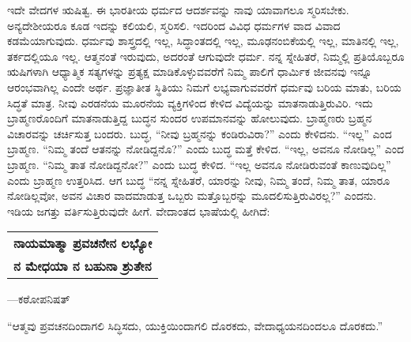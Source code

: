 ಇದೇ ವೇದಗಳ ಋಷಿತ್ವ. ಈ ಭಾರತೀಯ ಧರ್ಮದ ಆದರ್ಶವನ್ನು ನಾವು ಯಾವಾಗಲೂ ಸ್ಮರಿಸಬೇಕು. ಅನ್ಯದೇಶೀಯರೂ ಕೂಡ ಇದನ್ನು ಕಲಿಯಲಿ, ಸ್ಮರಿಸಲಿ. ಇದರಿಂದ ವಿವಿಧ ಧರ್ಮಗಳ ವಾದ ವಿವಾದ ಕಡಮೆಯಾಗುವುದು. ಧರ್ಮವು ಶಾಸ್ತ್ರದಲ್ಲಿ ಇಲ್ಲ, ಸಿದ್ಧಾಂತದಲ್ಲಿ ಇಲ್ಲ, ಮೂಢನಂಬಿಕೆಯಲ್ಲಿ ಇಲ್ಲ, ಮಾತಿನಲ್ಲಿ ಇಲ್ಲ, ತರ್ಕದಲ್ಲಿಯೂ ಇಲ್ಲ. ಆತ್ಮನಂತೆ ಇರುವುದು, ಅದರಂತೆ ಆಗುವುದೇ ಧರ್ಮ. ನನ್ನ ಸ್ನೇಹಿತರೆ, ನಿಮ್ಮಲ್ಲಿ ಪ್ರತಿಯೊಬ್ಬರೂ ಋಷಿಗಳಾಗಿ ಆಧ್ಯಾತ್ಮಿಕ ಸತ್ಯಗಳನ್ನು ಪ್ರತ್ಯಕ್ಷ ಮಾಡಿಕೊಳ್ಳುವವರೆಗೆ ನಿಮ್ಮ ಪಾಲಿಗೆ ಧಾರ್ಮಿಕ ಜೀವನವು ಇನ್ನೂ ಆರಂಭವಾಗಿಲ್ಲ ಎಂದೇ ಅರ್ಥ. ಪ್ರಜ್ಞಾತೀತ ಸ್ಥಿತಿಯು ನಿಮಗೆ ಲಭ್ಯವಾಗುವವರೆಗೆ ಧರ್ಮವು ಬರಿಯ ಮಾತು, ಬರಿಯ ಸಿದ್ಧತೆ ಮಾತ್ರ. ನೀವು ಎರಡನೆಯ ಮೂರನೆಯ ವ್ಯಕ್ತಿಗಳಿಂದ ಕೇಳಿದ ವಿದ್ಯೆಯನ್ನು ಮಾತನಾಡುತ್ತಿರುವಿರಿ. ಇದು ಬ್ರಾಹ್ಮಣರೊಂದಿಗೆ ಮಾತನಾಡುತ್ತಿದ್ದ ಬುದ್ಧನ ಸುಂದರ ಉಪಮಾನವನ್ನು ಹೋಲುವುದು. ಬ್ರಾಹ್ಮಣರು ಬ್ರಹ್ಮನ ವಿಚಾರವನ್ನು ಚರ್ಚಿಸುತ್ತ ಬಂದರು. ಬುದ್ಧ, “ನೀವು ಬ್ರಹ್ಮನನ್ನು ಕಂಡಿರುವಿರಾ?” ಎಂದು ಕೇಳಿದನು. “ಇಲ್ಲ” ಎಂದ ಬ್ರಾಹ್ಮಣ. “ನಿಮ್ಮ ತಂದೆ ಆತನನ್ನು ನೋಡಿದ್ದನೊ?” ಎಂದು ಬುದ್ಧ ಮತ್ತೆ ಕೇಳಿದ. “ಇಲ್ಲ, ಅವನೂ ನೋಡಿಲ್ಲ” ಎಂದ ಬ್ರಾಹ್ಮಣ. “ನಿಮ್ಮ ತಾತ ನೋಡಿದ್ದನೋ?” ಎಂದು ಬುದ್ಧ ಕೇಳಿದ. “ಇಲ್ಲ ಅವನೂ ನೋಡಿರುವಂತೆ ಕಾಣುವುದಿಲ್ಲ” ಎಂದು ಬ್ರಾಹ್ಮಣ ಉತ್ತರಿಸಿದ. ಆಗ ಬುದ್ಧ “ನನ್ನ ಸ್ನೇಹಿತರೆ, ಯಾರನ್ನು ನೀವು, ನಿಮ್ಮ ತಂದೆ, ನಿಮ್ಮ ತಾತ, ಯಾರೂ ನೋಡಿಲ್ಲವೋ, ಅವನ ವಿಚಾರ ವಾದಮಾಡುತ್ತ ಒಬ್ಬರು ಮತ್ತೊಬ್ಬರನ್ನು ಮೂದಲಿಸುತ್ತಿರುವಿರಲ್ಲ?” ಎಂದನು. ಇಡಿಯ ಜಗತ್ತು ವರ್ತಿಸುತ್ತಿರುವುದೇ ಹೀಗೆ. ವೇದಾಂತದ ಭಾಷೆಯಲ್ಲಿ ಹೀಗಿದೆ:

\vskip 3pt

\begin{longtable}{@{}l@{}}
\textbf{ನಾಯಮಾತ್ಮಾ ಪ್ರವಚನೇನ ಲಭ್ಯೋ} \\
\textbf{ನ ಮೇಧಯಾ ನ ಬಹುನಾ ಶ್ರುತೇನ} \\
\end{longtable}

\vskip 2pt

\hfill —ಕಠೋಪನಿಷತ್​

\vskip 6pt

“ಆತ್ಮವು ಪ್ರವಚನದಿಂದಾಗಲಿ ಸಿದ್ಧಿಸದು, ಯುಕ್ತಿಯಿಂದಾಗಲಿ ದೊರಕದು, ವೇದಾಧ್ಯಯನದಿಂದಲೂ ದೊರಕದು.”

\vskip 2pt

